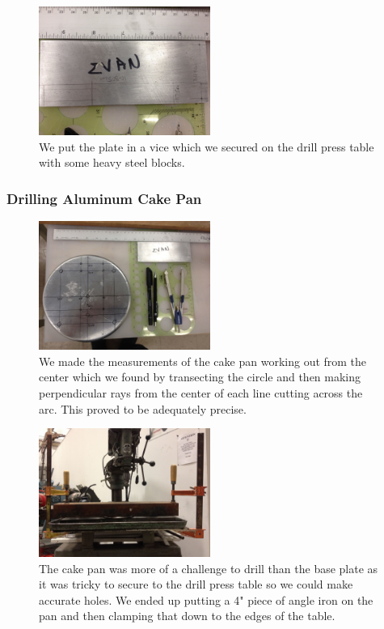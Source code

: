\documentclass[11pt]{article} %
\begin{document}
\begin{figure}
  \centering
  \caption{ We put the plate in a vice which we secured on the drill press table with some heavy steel blocks. }
  \includegraphics[width=0.50\textwidth]{feed/03.jpeg}
\end{figure}



\subsubsection{Drilling Aluminum Cake Pan}


\begin{figure}
  \centering
  \caption{ We made the measurements of the cake pan working out from the center which we found by transecting the circle and then making perpendicular rays from the center of each line cutting across the arc. This proved to be adequately precise. }
  \includegraphics[width=0.50\textwidth]{feed/04.jpeg}
\end{figure}



\begin{figure}
  \centering
  \caption{ The cake pan was more of a challenge to drill than the base plate as it was tricky to secure to the drill press table so we could make accurate holes. We ended up putting a 4" piece of angle iron on the pan and then clamping that down to the edges of the table.  }
  \includegraphics[width=0.50\textwidth]{feed/05.jpeg}
\end{figure}
\end{document}
